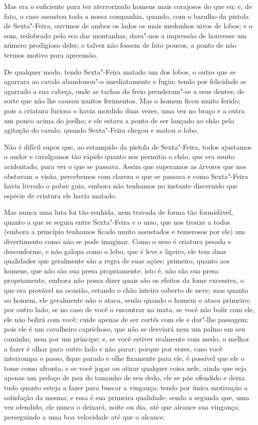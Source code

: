 Mas era o suficiente para ter aterrorizado homens mais corajosos do que
eu; e, de fato, o caso assustou toda a nossa companhia, quando, com o
barulho da pistola de Sexta"-Feira, ouvimos de ambos os lados os mais
medonhos uivos de lobos; e o som, redobrado pelo eco das montanhas,
dava"-nos a impressão de houvesse um número prodigioso deles; e talvez
não fossem de fato poucos, a ponto de não termos motivo para apreensão.

De qualquer modo, tendo Sexta"-Feira matado um dos lobos, o outro que se
agarrara ao cavalo abandonou"-o imediatamente e fugiu; tendo por
felicidade se agarrado a sua cabeça, onde as tachas do freio
prenderam"-se a seus dentes; de sorte que não lhe causou muitos
ferimentos. Mas o homem ficou muito ferido; pois a criatura furiosa o
havia mordido duas vezes, uma vez no braço e a outra um pouco acima do
joelho; e ele estava a ponto de ser lançado ao chão pela agitação do
cavalo, quando Sexta"-Feira chegou e matou o lobo.

Não é difícil supor que, ao estampido da pistola de Sexta"-Feira, todos
ajustamos o andor e cavalgamos tão rápido quanto nos permitia o chão,
que era muito acidentado, para ver o que se passava. Assim que superamos
as árvores que nos obstavam a visão, percebemos com clareza o que se
passara e como Sexta"-Feira havia livrado o pobre guia, embora não
tenhamos no instante discernido que espécie de criatura ele havia
matado.

Mas nunca uma luta foi tão renhida, nem travada de forma tão formidável,
quanto a que se seguiu entre Sexta"-Feira e o urso, que nos trouxe a
todos (embora a princípio tenhamos ficado muito assustados e temerosos
por ele) um divertimento como não se pode imaginar. Como o urso é
criatura pesada e desconforme, e não galopa como o lobo, que é leve e
ligeiro, ele tem duas qualidades que geralmente são a regra de suas
ações; primeiro, quanto aos homens, que não são sua presa propriamente;
isto é, não são sua presa propriamente, embora não possa dizer quais são
os efeitos da fome excessiva, o que era provável na ocasião, estando o
chão inteiro coberto de neve; mas quanto ao homem, ele geralmente não o
ataca, senão quando o homem o ataca primeiro; por outro lado, se no caso
de você o encontrar na mata, se você não bolir com ele, ele não bolirá
com você; cuide apenas de ser cortês com ele e dar"-lhe passagem; pois
ele é um cavalheiro caprichoso, que não se desviará nem um palmo em seu
caminho, nem por um príncipe; e, se você estiver realmente com medo, o
melhor a fazer é olhar para outro lado e não parar; porque por vezes,
caso você interrompa o passo, fique parado e olhe fixamente para ele, é
possível que ele o tome como afronta; e se você jogar ou atirar qualquer
coisa nele, ainda que seja apenas um pedaço de pau do tamanho de seu
dedo, ele se põe ofendido e deixa tudo quanto esteja a fazer para buscar
a vingança; tendo por única motivação a satisfação da mesma; e essa é
sua primeira qualidade; sendo a segunda que, uma vez ofendido, ele nunca
o deixará, noite ou dia, até que alcance sua vingança; perseguindo a uma
boa velocidade até que o alcance.

